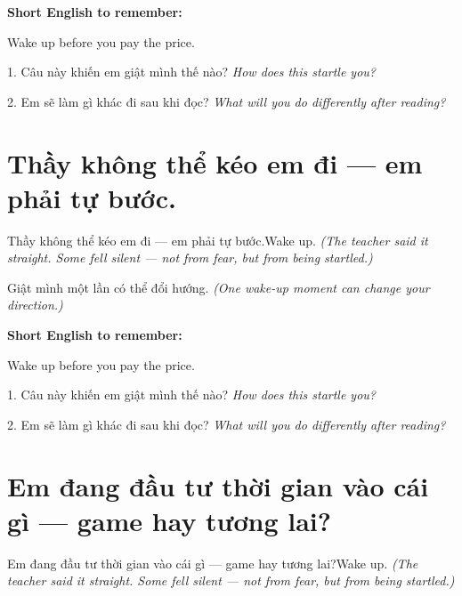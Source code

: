 \begin{ghinhoanh}
\textbf{Short English to remember:}

Wake up before you pay the price.

\end{ghinhoanh}

\begin{tuhocnhanh}
1. Câu này khiến em giật mình thế nào? \textit{How does this startle you?}

2. Em sẽ làm gì khác đi sau khi đọc? \textit{What will you do differently after reading?}
\end{tuhocnhanh}
\ngancach


\section{Thầy không thể kéo em đi — em phải tự bước.}
\begin{truyen}{Thầy không thể kéo em đi — em phải tự bước.}{Wake up.}
\textit{(The teacher said it straight. Some fell silent — not from fear, but from being startled.)}
\end{truyen}

\begin{baihoc}
Giật mình một lần có thể đổi hướng.
\textit{(One wake-up moment can change your direction.)}
\end{baihoc}

\begin{ghinhoanh}
\textbf{Short English to remember:}

Wake up before you pay the price.

\end{ghinhoanh}

\begin{tuhocnhanh}
1. Câu này khiến em giật mình thế nào? \textit{How does this startle you?}

2. Em sẽ làm gì khác đi sau khi đọc? \textit{What will you do differently after reading?}
\end{tuhocnhanh}
\ngancach


\section{Em đang đầu tư thời gian vào cái gì — game hay tương lai?}
\begin{truyen}{Em đang đầu tư thời gian vào cái gì — game hay tương lai?}{Wake up.}
\textit{(The teacher said it straight. Some fell silent — not from fear, but from being startled.)}
\end{truyen}

